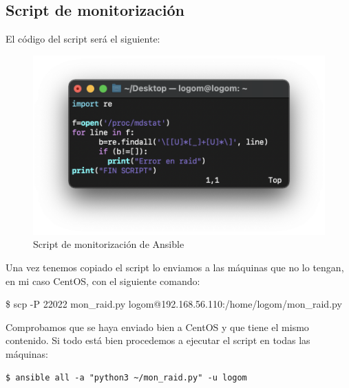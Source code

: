 \subsection{Script de monitorización}
El código del script será el siguiente:
    \begin{figure}[H]
        \centering
        \includegraphics[scale=0.5]{images/mon_raid.png}
        \caption{Script de monitorización de Ansible}
        \label{fig:mon_raid}
    \end{figure}

Una vez tenemos copiado el script lo enviamos a las máquinas que no lo tengan, en mi caso CentOS, con el siguiente comando:
    \begin{tcolorbox}[colback=black!10, halign=left]
        \$ scp -P 22022 mon\_raid.py logom@192.168.56.110:/home/logom/mon\_raid.py
    \end{tcolorbox}

Comprobamos que se haya enviado bien a CentOS y que tiene el mismo contenido. Si todo está bien procedemos a ejecutar el script en todas las máquinas:
    \begin{tcolorbox}[colback=black!10, halign=left]
        \begin{verbatim}$ ansible all -a "python3 ~/mon_raid.py" -u logom \end{verbatim}
    \end{tcolorbox}

